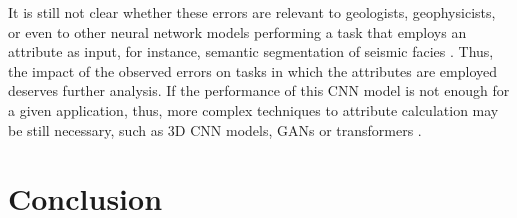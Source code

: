 \documentclass[conference]{IEEEtran}
\begin{document}
It is still not clear whether these errors are relevant to geologists, geophysicists, or even to other neural network models performing a task that employs an attribute as input, for instance, semantic segmentation of seismic facies \cite{semantic-segmentation}. Thus, the impact of the observed errors on tasks in which the attributes are employed deserves further analysis. If the performance of this CNN model is not enough for a given application, thus, more complex techniques to attribute calculation may be still necessary, such as 3D CNN models, GANs \cite{SEG20-navarro-seismic-attr} or transformers \cite{transformers}.





\section{Conclusion}
\label{sec:conslusion}
\end{document}
